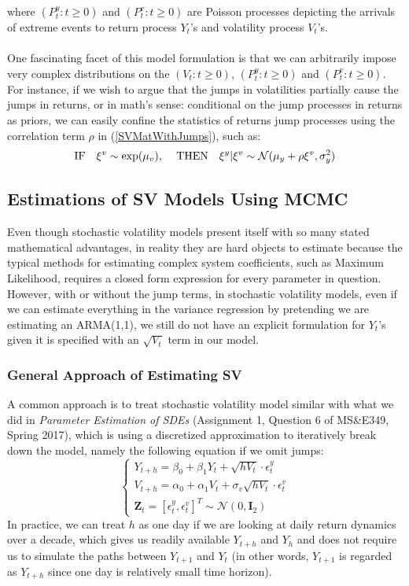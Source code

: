 \documentclass[letterpaper]{article}
\newcommand{\ZZ}{\mathbf{Z}}
\begin{document}
	where $(P_t^{y}:t\geq0)$ and $(P_t^v:t\geq0)$ are Poisson processes depicting the arrivals of extreme events to return process $Y_t$'s and volatility process $V_t$'s.\\\\
	One fascinating facet of this model formulation is that we can arbitrarily impose very complex distributions on the $(V_t:t\geq0)$, $(P_t^y:t\geq0)$ and $(P_t^v:t\geq0)$. For instance, if we wish to argue that the jumps in volatilities partially cause the jumps in returns, or in math's sense: conditional on the jump processes in returns as priors, we can easily confine the statistics of returns jump processes using the correlation term $\rho$ in (\ref{SVMatWithJumps}), such as:
	\begin{equation}
	\text{IF\quad}\xi^v\sim\exp(\mu_v)
	\text{, \quad THEN\quad}\xi^y|\xi^v\sim\mathcal{N}(\mu_y+\rho\xi^v,\sigma_y^2)
	\end{equation}
	\subsection{Estimations of SV Models Using MCMC}
	Even though stochastic volatility models present itself with so many stated mathematical advantages, in reality they are hard objects to estimate because the typical methods for estimating complex system coefficients, such as Maximum Likelihood, requires a closed form expression for every parameter in question. However, with or without the jump terms, in stochastic volatility models, even if we can estimate everything in the variance regression by pretending we are estimating an ARMA(1,1), we still do not have an explicit formulation for $Y_t$'s given it is specified with an $\sqrt{V_t}$ term in our model.
	\subsubsection{General Approach of Estimating SV}
	A common approach is to treat stochastic volatility model similar with what we did in \textit{Parameter Estimation of SDEs} (Assignment 1, Question 6 of MS\&E349, Spring 2017), which is using a discretized approximation to iteratively break down the model, namely the following equation if we omit jumps:
	\begin{equation}\label{SVDiscrete}
	\begin{cases}
	Y_{t+h}=\beta_0+\beta_1Y_t+\sqrt{hV_t}\cdot\epsilon_t^y\\
	V_{t+h}=\alpha_0+\alpha_1V_t+\sigma_v\sqrt{hV_t}\cdot\epsilon_t^v\\
	\ZZ_t=[\epsilon_t^y,\epsilon_t^v]^T\sim\mathcal{N}(0,\mathbf{I}_2)
	\end{cases}
	\end{equation} 
	In practice, we can treat $h$ as one day if we are looking at daily return dynamics over a decade, which gives us readily available $Y_{t+h}$ and $Y_h$ and does not require us to simulate the paths between $Y_{t+1}$ and $Y_t$ (in other words, $Y_{t+1}$ is regarded as $Y_{t+h}$ since one day is relatively small time horizon).
\end{document}
